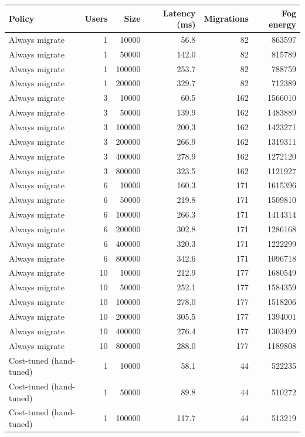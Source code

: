 \begin{table}[h]
\centering
\begin{tabular}{@{}lrrrrr@{}}
\toprule
Policy & Users & Size & Latency (ms) & Migrations & Fog energy \\
\midrule
Always migrate & 1 & 10000 & 56.8 & 82 & 863597 \\
Always migrate & 1 & 50000 & 142.0 & 82 & 815789 \\
Always migrate & 1 & 100000 & 253.7 & 82 & 788759 \\
Always migrate & 1 & 200000 & 329.7 & 82 & 712389 \\
Always migrate & 3 & 10000 & 60.5 & 162 & 1566010 \\
Always migrate & 3 & 50000 & 139.9 & 162 & 1483889 \\
Always migrate & 3 & 100000 & 200.3 & 162 & 1423271 \\
Always migrate & 3 & 200000 & 266.9 & 162 & 1319311 \\
Always migrate & 3 & 400000 & 278.9 & 162 & 1272120 \\
Always migrate & 3 & 800000 & 323.5 & 162 & 1121927 \\
Always migrate & 6 & 10000 & 160.3 & 171 & 1615396 \\
Always migrate & 6 & 50000 & 219.8 & 171 & 1509810 \\
Always migrate & 6 & 100000 & 266.3 & 171 & 1414314 \\
Always migrate & 6 & 200000 & 302.8 & 171 & 1286168 \\
Always migrate & 6 & 400000 & 320.3 & 171 & 1222299 \\
Always migrate & 6 & 800000 & 342.6 & 171 & 1096718 \\
Always migrate & 10 & 10000 & 212.9 & 177 & 1680549 \\
Always migrate & 10 & 50000 & 252.1 & 177 & 1584359 \\
Always migrate & 10 & 100000 & 278.0 & 177 & 1518206 \\
Always migrate & 10 & 200000 & 305.5 & 177 & 1394001 \\
Always migrate & 10 & 400000 & 276.4 & 177 & 1303499 \\
Always migrate & 10 & 800000 & 288.0 & 177 & 1189808 \\
Cost-tuned (hand-tuned) & 1 & 10000 & 58.1 & 44 & 522235 \\
Cost-tuned (hand-tuned) & 1 & 50000 & 89.8 & 44 & 510272 \\
Cost-tuned (hand-tuned) & 1 & 100000 & 117.7 & 44 & 513219 \\

\end{tabular}
\end{table}
